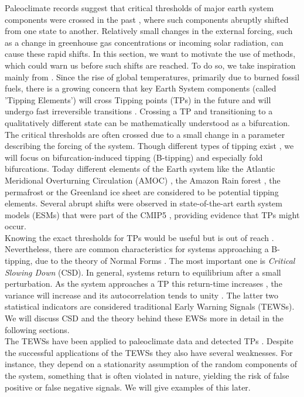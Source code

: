 \documentclass[%
thesis=student,%
coverpage=false,%
titlepage=false,%
headmarks=true, %
english,%
font=libertine, %
math=newpxtx, %
BCOR=5mm,%
coverBCOR=11mm%
]{tumbook}
\begin{document}
Paleoclimate records suggest that critical thresholds of major earth system components were crossed in the past \cite{Brovkin:2021}, where such components abruptly shifted from one state to another. Relatively small changes in the external forcing, such as a change in greenhouse gas concentrations or incoming solar radiation, can cause these rapid shifts. In this section, we want to motivate the use of methods, which could warn us before such shifts are reached. To do so, we take inspiration mainly from \cite{Clarke:2023}.
Since the rise of global temperatures, primarily due to burned fossil fuels, there is a growing concern \cite{Lenton:2019,Steffen:2018,Ritchie:2021} that key Earth System components (called 'Tipping Elements') will cross Tipping points (TPs) in the future and will undergo fast irreversible transitions \cite{Lenton:2008}. 
Crossing a TP and transitioning to a qualitatively different state can be mathematically understood as a bifurcation. The critical thresholds are often crossed due to a small change in a parameter describing the forcing of the system. Though different types of tipping exist \cite{Ashwin:2012}, we will focus on bifurcation-induced tipping (B-tipping) and especially fold bifurcations. Today different elements of the Earth system like the Atlantic Meridional Overturning Circulation (AMOC) \cite{Stommel:1961}, the Amazon Rain forest \cite{Cox:2000}, the permafrost \cite{Steffen:2018} or the Greenland ice sheet \cite{Feldmann:2015} are considered to be potential tipping elements. Several abrupt shifts were observed in state-of-the-art earth system models (ESMs) that were part of the CMIP5 \cite{Taylor:2012}, providing evidence that TPs might occur. \\
Knowing the exact thresholds for TPs would be useful but is out of reach \cite{Steffen:2018,Drijfhout:2015}. Nevertheless, there are common characteristics for systems approaching a B-tipping, due to the theory of Normal Forms \cite{Strogatz:2015,Guckenheimer:1983}. The most important one is \emph{Critical Slowing Down} (CSD). In general, systems return to equilibrium after a small perturbation. As the system approaches a TP this return-time increases \cite{Scheffer:2012}, the variance will increase and its autocorrelation tends to unity \cite{Scheffer:2009,Held:2004}. The latter two statistical indicators are considered traditional Early Warning Signals (TEWSs). We will discuss CSD and the theory behind these EWSs more in detail in the following sections. \\
The TEWSs have been applied to paleoclimate data and detected TPs \cite{Boers:2018}. Despite the successful applications of the TEWSs they also have several weaknesses. For instance, they depend on a stationarity assumption of the random components of the system, something that is often violated in nature, yielding the risk of false positive or false negative signals. We will give examples of this later. 
\end{document}
